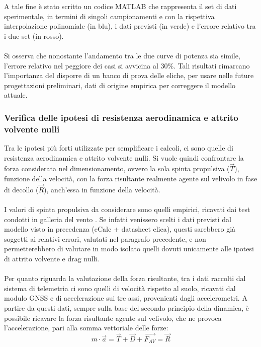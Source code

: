 \documentclass[12pt]{article}
\begin{document}
\noindent
A tale fine è stato scritto un codice MATLAB che rappresenta il set di dati sperimentale, in termini di singoli campionamenti e con la rispettiva interpolazione polinomiale (in blu), i dati previsti (in verde) e l'errore relativo tra i due set (in rosso). 
\\\\
Si osserva che nonostante l'andamento tra le due curve di potenza sia simile, l'errore relativo nel peggiore dei casi si avvicina al 30\%. Tali risultati rimarcano l'importanza del disporre di un banco di prova delle eliche, per usare nelle future progettazioni preliminari, dati di origine empirica per correggere il modello attuale.

\subsubsection{Verifica delle ipotesi di resistenza aerodinamica e attrito volvente nulli}
Tra le ipotesi più forti utilizzate per semplificare i calcoli, ci sono quelle di resistenza aerodinamica e attrito volvente nulli. Si vuole quindi confrontare la forza considerata nel dimensionamento, ovvero la sola spinta propulsiva ($\overrightarrow{T}$), funzione della velocità, con la forza risultante realmente agente sul velivolo in fase di decollo ($\overrightarrow{R}$), anch'essa in funzione della velocità. 
\\\\
I valori di spinta propulsiva da considerare sono quelli empirici, ricavati dai test condotti in galleria del vento \cite{windtunnel}. Se infatti venissero scelti i dati previsti dal modello visto in precedenza (eCalc + datasheet elica), questi sarebbero già soggetti ai relativi errori, valutati nel paragrafo precedente, e non permetterebbero di valutare in modo isolato quelli dovuti unicamente alle ipotesi di attrito volvente e drag nulli.
\\\\
Per quanto riguarda la valutazione della forza risultante, tra i dati raccolti dal sistema di telemetria ci sono quelli di velocità rispetto al suolo, ricavati dal modulo GNSS e di accelerazione sui tre assi, provenienti dagli accelerometri. A partire da questi dati, sempre sulla base del secondo principio della dinamica, è possibile ricavare la forza risultante agente sul velivolo, che ne provoca l'accelerazione, pari alla somma vettoriale delle forze:
\begin{equation}
m \cdot \overrightarrow{a} = \overrightarrow{T} + \overrightarrow{D} + \overrightarrow{F_{AV}} = \overrightarrow{R}
\end{equation}
\end{document}
